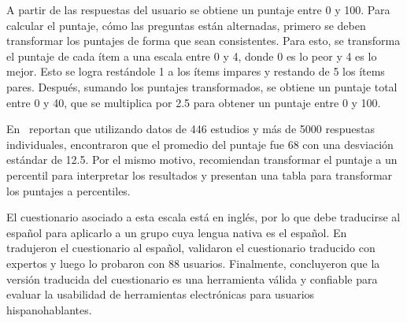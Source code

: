 A partir de las respuestas del usuario se obtiene un puntaje entre 0 y 100. Para calcular el puntaje, cómo las preguntas están alternadas, primero se deben transformar los puntajes de forma que sean consistentes. Para esto, se transforma el puntaje de cada ítem a una escala entre 0 y 4, donde 0 es lo peor y 4 es lo mejor. Esto se logra restándole 1 a los ítems impares y restando de 5 los ítems pares. Después, sumando los puntajes transformados, se obtiene un puntaje total entre 0 y 40, que se multiplica por 2.5 para obtener un puntaje entre 0 y 100.

En~\cite{quantifying-the-user-experience} reportan que utilizando datos de 446 estudios y más de 5000 respuestas individuales, encontraron que el promedio del puntaje fue 68 con una desviación estándar de 12.5. Por el mismo motivo, recomiendan transformar el puntaje a un percentil para interpretar los resultados y presentan una tabla para transformar los puntajes a percentiles.

El cuestionario asociado a esta escala está en inglés, por lo que debe traducirse al español para aplicarlo a un grupo cuya lengua nativa es el español. En~\cite{spanish-sus} tradujeron el cuestionario al español, validaron el cuestionario traducido con expertos y luego lo probaron con 88 usuarios. Finalmente, concluyeron que la versión traducida del cuestionario es una herramienta válida y confiable para evaluar la usabilidad de herramientas electrónicas para usuarios hispanohablantes.
